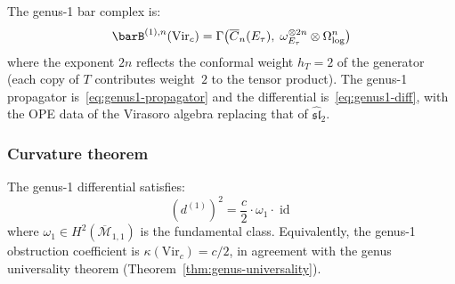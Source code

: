 The genus-1 bar complex is:
\begin{equation}\label{eq:vir-genus1-bar}
\barB^{(1),n}(\mathrm{Vir}_c) = \Gamma\bigl(\overline{C}_n(E_\tau),\;
  \omega_{E_\tau}^{\otimes 2n} \otimes \Omega^n_{\log}\bigr)
\end{equation}
where the exponent $2n$ reflects the conformal weight $h_T = 2$ of the
generator (each copy of $T$ contributes weight~$2$ to the tensor product).
The genus-1 propagator is~\eqref{eq:genus1-propagator}
and the differential is~\eqref{eq:genus1-diff}, with the OPE data of the
Virasoro algebra replacing that of $\widehat{\mathfrak{sl}}_2$.

\subsubsection{Curvature theorem}

\begin{theorem}
\label{thm:vir-genus1-curvature}
The genus-1 differential satisfies:
\begin{equation}\label{eq:vir-genus1-dsquared}
(d^{(1)})^2 = \frac{c}{2} \cdot \omega_1 \cdot \operatorname{id}
\end{equation}
where $\omega_1 \in H^2(\overline{\mathcal{M}}_{1,1})$ is the fundamental class.
Equivalently, the genus-1 obstruction coefficient is
$\kappa(\mathrm{Vir}_c) = c/2$, in agreement with the genus universality
theorem (Theorem~\ref{thm:genus-universality}).
\end{theorem}


